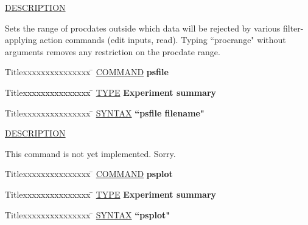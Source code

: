 \underline{DESCRIPTION}
\begin{list}{}{\setlength{\leftmargin}{0.5in}
     \setlength{\rightmargin}{0in}}
\item
Sets the range of procdates outside which data will be rejected by
various filter-applying action commands (edit inputs, read).
Typing ``procrange" without arguments removes any restriction on the
procdate range.
\end{list}
\vspace{.2in}

\begin{tabbing}
Titlexxxxxxxxxxxxxxx \= \kill
\underline{COMMAND} \> {\bf 	psfile} \\
\end{tabbing}

\begin{tabbing}
Titlexxxxxxxxxxxxxxx \= \kill
\underline{TYPE} \> {\bf 		Experiment summary} \\
\end{tabbing}

\begin{tabbing}
Titlexxxxxxxxxxxxxxx \= \kill
\underline{SYNTAX} \> {\bf 		``psfile filename"} \\
\end{tabbing}

\underline{DESCRIPTION}
\begin{list}{}{\setlength{\leftmargin}{0.5in}
     \setlength{\rightmargin}{0in}}
\item
This command is not yet implemented.  Sorry.
\end{list}
\vspace{.2in}

\begin{tabbing}
Titlexxxxxxxxxxxxxxx \= \kill
\underline{COMMAND} \> {\bf 	psplot} \\
\end{tabbing}

\begin{tabbing}
Titlexxxxxxxxxxxxxxx \= \kill
\underline{TYPE} \> {\bf 		Experiment summary} \\
\end{tabbing}

\begin{tabbing}
Titlexxxxxxxxxxxxxxx \= \kill
\underline{SYNTAX} \> {\bf 		``psplot"} \\
\end{tabbing}

